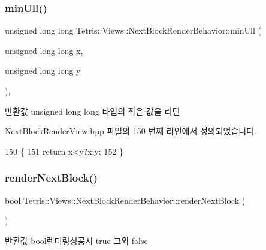 \subsubsection{\texorpdfstring{min\+Ull()}{minUll()}}
{\footnotesize\ttfamily unsigned long long Tetris\+::\+Views\+::\+Next\+Block\+Render\+Behavior\+::min\+Ull (\begin{DoxyParamCaption}\item[{unsigned long long}]{x,  }\item[{unsigned long long}]{y }\end{DoxyParamCaption})\hspace{0.3cm}{\ttfamily [inline]}, {\ttfamily [private]}}

\begin{DoxyReturn}{반환값}
unsigned long long 타입의 작은 값을 리턴 
\end{DoxyReturn}


Next\+Block\+Render\+View.\+hpp 파일의 150 번째 라인에서 정의되었습니다.


\begin{DoxyCode}
150                                                                                 \{
151                 \textcolor{keywordflow}{return} x<y?x:y;
152             \}
\end{DoxyCode}
\mbox{\label{class_tetris_1_1_views_1_1_next_block_render_behavior_aa9240528e0603ca129d7877f9e71b27d}} 
\subsubsection{\texorpdfstring{render\+Next\+Block()}{renderNextBlock()}}
{\footnotesize\ttfamily bool Tetris\+::\+Views\+::\+Next\+Block\+Render\+Behavior\+::render\+Next\+Block (\begin{DoxyParamCaption}{ }\end{DoxyParamCaption})\hspace{0.3cm}{\ttfamily [inline]}}

\begin{DoxyReturn}{반환값}
bool렌더링성공시 true 그외 false 
\end{DoxyReturn}


